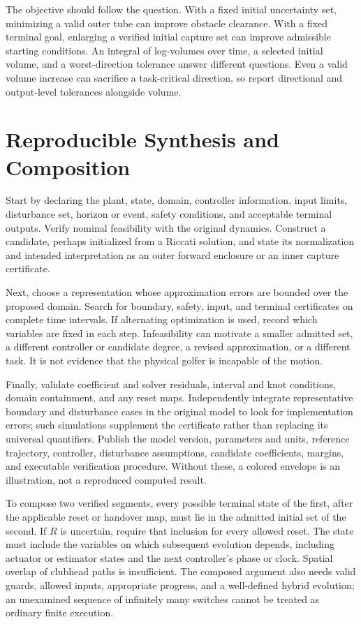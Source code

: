 The objective should follow the question. With a fixed initial uncertainty set, minimizing a valid outer tube can improve obstacle clearance. With a fixed terminal goal, enlarging a verified initial capture set can improve admissible starting conditions. An integral of log-volumes over time, a selected initial volume, and a worst-direction tolerance answer different questions. Even a valid volume increase can sacrifice a task-critical direction, so report directional and output-level tolerances alongside volume.

\section{Reproducible Synthesis and Composition}

Start by declaring the plant, state, domain, controller information, input limits, disturbance set, horizon or event, safety conditions, and acceptable terminal outputs. Verify nominal feasibility with the original dynamics. Construct a candidate, perhaps initialized from a Riccati solution, and state its normalization and intended interpretation as an outer forward enclosure or an inner capture certificate.

Next, choose a representation whose approximation errors are bounded over the proposed domain. Search for boundary, safety, input, and terminal certificates on complete time intervals. If alternating optimization is used, record which variables are fixed in each step. Infeasibility can motivate a smaller admitted set, a different controller or candidate degree, a revised approximation, or a different task. It is not evidence that the physical golfer is incapable of the motion.

Finally, validate coefficient and solver residuals, interval and knot conditions, domain containment, and any reset maps. Independently integrate representative boundary and disturbance cases in the original model to look for implementation errors; such simulations supplement the certificate rather than replacing its universal quantifiers. Publish the model version, parameters and units, reference trajectory, controller, disturbance assumptions, candidate coefficients, margins, and executable verification procedure. Without these, a colored envelope is an illustration, not a reproduced computed result.

To compose two verified segments, every possible terminal state of the first, after the applicable reset or handover map, must lie in the admitted initial set of the second. If $R$ is uncertain, require that inclusion for every allowed reset. The state must include the variables on which subsequent evolution depends, including actuator or estimator states and the next controller's phase or clock. Spatial overlap of clubhead paths is insufficient. The composed argument also needs valid guards, allowed inputs, appropriate progress, and a well-defined hybrid evolution; an unexamined sequence of infinitely many switches cannot be treated as ordinary finite execution.

